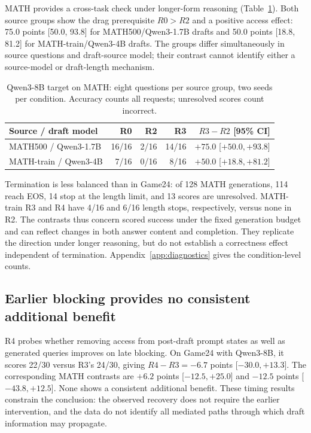 \documentclass{article}
\begin{document}
MATH provides a cross-task check under longer-form reasoning (Table~\ref{tab:math}). Both source groups show the drag prerequisite $R0>R2$ and a positive access effect: 75.0 points [50.0, 93.8] for MATH500/Qwen3-1.7B drafts and 50.0 points [18.8, 81.2] for MATH-train/Qwen3-4B drafts. The groups differ simultaneously in source questions and draft-source model; their contrast cannot identify either a source-model or draft-length mechanism.

\begin{table}[t]
\caption{Qwen3-8B target on MATH: eight questions per source group, two seeds per condition. Accuracy counts all requests; unresolved scores count incorrect.}
\label{tab:math}
\centering\small
\begin{tabular}{lrrrr}
\toprule
Source / draft model & R0 & R2 & R3 & $R3-R2$ [95\% CI] \\
\midrule
MATH500 / Qwen3-1.7B & 16/16 & 2/16 & 14/16 & $+75.0$ [$+50.0,+93.8$] \\
MATH-train / Qwen3-4B & 7/16 & 0/16 & 8/16 & $+50.0$ [$+18.8,+81.2$] \\
\bottomrule
\end{tabular}
\end{table}

Termination is less balanced than in Game24: of 128 MATH generations, 114 reach EOS, 14 stop at the length limit, and 13 scores are unresolved. MATH-train R3 and R4 have 4/16 and 6/16 length stops, respectively, versus none in R2. The contrasts thus concern scored success under the fixed generation budget and can reflect changes in both answer content and completion. They replicate the direction under longer reasoning, but do not establish a correctness effect independent of termination. Appendix~\ref{app:diagnostics} gives the condition-level counts.

\subsection{Earlier blocking provides no consistent additional benefit}
\label{sec:timing}

R4 probes whether removing access from post-draft prompt states as well as generated queries improves on late blocking. On Game24 with Qwen3-8B, it scores 22/30 versus R3's 24/30, giving $R4-R3=-6.7$ points [${-30.0},{+13.3}$]. The corresponding MATH contrasts are $+6.2$ points [${-12.5},{+25.0}$] and $-12.5$ points [${-43.8},{+12.5}$]. None shows a consistent additional benefit. These timing results constrain the conclusion: the observed recovery does not require the earlier intervention, and the data do not identify all mediated paths through which draft information may propagate.
\end{document}
